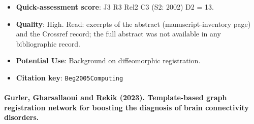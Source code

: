 \documentclass[journal,onecolumn]{IEEEtran}
\begin{document}
\begin{itemize}
\item{} \textbf{Quick-assessment score}: J3 R3 Rel2 C3 (S2: 2002) D2 = 13.

\item{} \textbf{Quality}: High. Read: excerpts of the abstract (manuscript-inventory page) and the Crossref record; the full abstract was not available in any bibliographic record.

\item{} \textbf{Potential Use}: Background on diffeomorphic registration.

\item{} \textbf{Citation key}: \texttt{Beg2005Computing}

\end{itemize}

\paragraph{Gurler, Gharsallaoui and Rekik (2023). Template-based graph registration network for boosting the diagnosis of brain connectivity disorders.~\cite{Gurler2023Template}}\mbox{}
\end{document}
